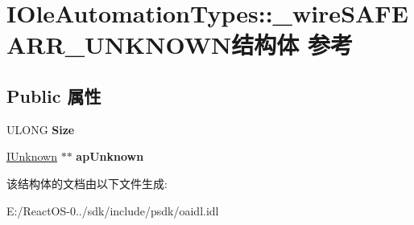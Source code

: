 \hypertarget{struct_i_ole_automation_types_1_1__wire_s_a_f_e_a_r_r___u_n_k_n_o_w_n}{}\section{I\+Ole\+Automation\+Types\+:\+:\+\_\+wire\+S\+A\+F\+E\+A\+R\+R\+\_\+\+U\+N\+K\+N\+O\+W\+N结构体 参考}
\label{struct_i_ole_automation_types_1_1__wire_s_a_f_e_a_r_r___u_n_k_n_o_w_n}
\subsection*{Public 属性}
\begin{DoxyCompactItemize}
\item 
\mbox{\label{struct_i_ole_automation_types_1_1__wire_s_a_f_e_a_r_r___u_n_k_n_o_w_n_a971d4fbc14a1f1d52f95682ca8cd9d92}} 
U\+L\+O\+NG {\bfseries Size}
\item 
\mbox{\label{struct_i_ole_automation_types_1_1__wire_s_a_f_e_a_r_r___u_n_k_n_o_w_n_a0fb0c959a8a7958d4e7db4bf8b14c869}} 
\hyperlink{interface_i_unknown}{I\+Unknown} $\ast$$\ast$ {\bfseries ap\+Unknown}
\end{DoxyCompactItemize}


该结构体的文档由以下文件生成\+:\begin{DoxyCompactItemize}
\item 
E\+:/\+React\+O\+S-\/0../sdk/include/psdk/oaidl.\+idl\end{DoxyCompactItemize}
